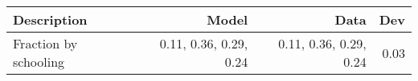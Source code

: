 \begin{tabular}{lrrr}
\hline
Description & Model  & Data  & Dev  \\ 
\hline
Fraction by schooling & 0.11, 0.36, 0.29, 0.24  & 0.11, 0.36, 0.29, 0.24  & 0.03  \\ 
\hline
\end{tabular}%
